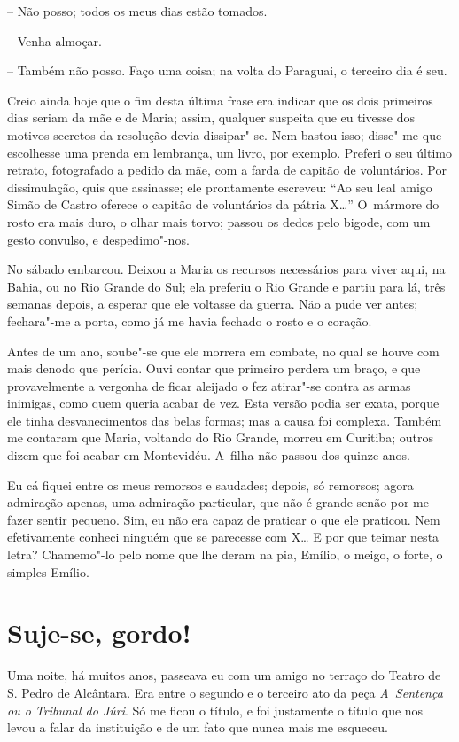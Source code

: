 -- Não posso; todos os meus dias estão tomados.

-- Venha almoçar.

-- Também não posso. Faço uma coisa; na volta do Paraguai, o terceiro
dia é seu.

Creio ainda hoje que o fim desta última frase era indicar que os dois
primeiros dias seriam da mãe e de Maria; assim, qualquer suspeita que eu
tivesse dos motivos secretos da resolução devia dissipar"-se. Nem bastou
isso; disse"-me que escolhesse uma prenda em lembrança, um livro, por
exemplo. Preferi o seu último retrato, fotografado a pedido da mãe, com
a farda de capitão de voluntários. Por dissimulação, quis que assinasse;
ele prontamente escreveu: ``Ao seu leal amigo Simão de Castro oferece o
capitão de voluntários da pátria X\ldots{}'' O~mármore do rosto era mais
duro, o olhar mais torvo; passou os dedos pelo bigode, com um gesto
convulso, e despedimo"-nos.

No sábado embarcou. Deixou a Maria os recursos necessários para viver
aqui, na Bahia, ou no Rio Grande do Sul; ela preferiu o Rio Grande e
partiu para lá, três semanas depois, a esperar que ele voltasse da
guerra. Não a pude ver antes; fechara"-me a porta, como já me havia
fechado o rosto e o coração.

Antes de um ano, soube"-se que ele morrera em combate, no qual se houve
com mais denodo que perícia. Ouvi contar que primeiro perdera um braço,
e que provavelmente a vergonha de ficar aleijado o fez atirar"-se contra
as armas inimigas, como quem queria acabar de vez. Esta versão podia ser
exata, porque ele tinha desvanecimentos das belas formas; mas a causa
foi complexa. Também me contaram que Maria, voltando do Rio Grande,
morreu em Curitiba; outros dizem que foi acabar em Montevidéu. A~filha
não passou dos quinze anos.

Eu cá fiquei entre os meus remorsos e saudades; depois, só remorsos;
agora admiração apenas, uma admiração particular, que não é grande senão
por me fazer sentir pequeno. Sim, eu não era capaz de praticar o que ele
praticou. Nem efetivamente conheci ninguém que se parecesse com X\ldots{} E
por que teimar nesta letra? Chamemo"-lo pelo nome que lhe deram na pia,
Emílio, o meigo, o forte, o simples Emílio.

\chapter{Suje-se, gordo!}

Uma noite, há muitos anos, passeava eu com um amigo no terraço do Teatro
de S. Pedro de Alcântara. Era entre o segundo e o terceiro ato da peça
\emph{A~Sentença ou o Tribunal do Júri}. Só me ficou o título, e foi
justamente o título que nos levou a falar da instituição e de um fato
que nunca mais me esqueceu.


